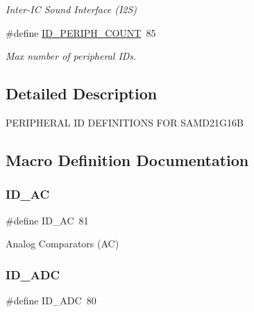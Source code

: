 \begin{DoxyCompactItemize}
\begin{DoxyCompactList}\small\item\em Inter-\/\+IC Sound Interface (I2S) \end{DoxyCompactList}\item 
\#define \mbox{\hyperlink{group___s_a_m_d21_g16_b__id_gad0762589e782b5eca161d9d344306da7}{I\+D\+\_\+\+P\+E\+R\+I\+P\+H\+\_\+\+C\+O\+U\+NT}}~85
\begin{DoxyCompactList}\small\item\em Max number of peripheral I\+Ds. \end{DoxyCompactList}\end{DoxyCompactItemize}


\subsection{Detailed Description}
P\+E\+R\+I\+P\+H\+E\+R\+AL ID D\+E\+F\+I\+N\+I\+T\+I\+O\+NS F\+OR S\+A\+M\+D21\+G16B 

\subsection{Macro Definition Documentation}
\mbox{\label{group___s_a_m_d21_g16_b__id_ga20fe08f8d0b2a4e6c0dbb2371aacadb0}} 
\subsubsection{\texorpdfstring{ID\_AC}{ID\_AC}}
{\footnotesize\ttfamily \#define I\+D\+\_\+\+AC~81}



Analog Comparators (AC) 

\mbox{\label{group___s_a_m_d21_g16_b__id_gafb7efa537d1d64419483b97f642009fd}} 
\subsubsection{\texorpdfstring{ID\_ADC}{ID\_ADC}}
{\footnotesize\ttfamily \#define I\+D\+\_\+\+A\+DC~80}



